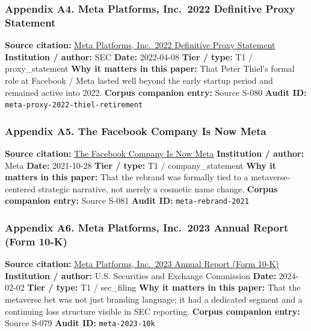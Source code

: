 \documentclass[
  american,
  11pt,
  letterpaper,
]{article}
\begin{document}
\subsubsection{Appendix A4. Meta Platforms, Inc.~2022 Definitive Proxy
Statement}\label{ch-01-appendix-a4-meta-platforms-inc-2022-definitive-proxy-statement}

\textbf{Source citation:}
\href{https://www.sec.gov/Archives/edgar/data/1326801/000132680122000043/meta2022definitiveproxysta.htm}{Meta
Platforms, Inc.~2022 Definitive Proxy Statement} \textbf{Institution /
author:} SEC \textbf{Date:} 2022-04-08 \textbf{Tier / type:} T1 /
proxy\_statement \textbf{Why it matters in this paper:} That Peter
Thiel's formal role at Facebook / Meta lasted well beyond the early
startup period and remained active into 2022. \textbf{Corpus companion
entry:} Source S-080 \textbf{Audit ID:}
\texttt{meta-proxy-2022-thiel-retirement}

\subsubsection{Appendix A5. The Facebook Company Is Now
Meta}\label{ch-01-appendix-a5-the-facebook-company-is-now-meta}

\textbf{Source citation:}
\href{https://about.fb.com/news/2021/10/facebook-company-is-now-meta/}{The
Facebook Company Is Now Meta} \textbf{Institution / author:} Meta
\textbf{Date:} 2021-10-28 \textbf{Tier / type:} T1 / company\_statement
\textbf{Why it matters in this paper:} That the rebrand was formally
tied to a metaverse-centered strategic narrative, not merely a cosmetic
name change. \textbf{Corpus companion entry:} Source S-081 \textbf{Audit
ID:} \texttt{meta-rebrand-2021}

\subsubsection{Appendix A6. Meta Platforms, Inc.~2023 Annual Report
(Form
10-K)}\label{ch-01-appendix-a6-meta-platforms-inc-2023-annual-report-form-10-k}

\textbf{Source citation:}
\href{https://www.sec.gov/Archives/edgar/data/1326801/000132680124000012/meta-20231231.htm}{Meta
Platforms, Inc.~2023 Annual Report (Form 10-K)} \textbf{Institution /
author:} U.S. Securities and Exchange Commission \textbf{Date:}
2024-02-02 \textbf{Tier / type:} T1 / sec\_filing \textbf{Why it matters
in this paper:} That the metaverse bet was not just branding language;
it had a dedicated segment and a continuing loss structure visible in
SEC reporting. \textbf{Corpus companion entry:} Source S-079
\textbf{Audit ID:} \texttt{meta-2023-10k}
\end{document}
